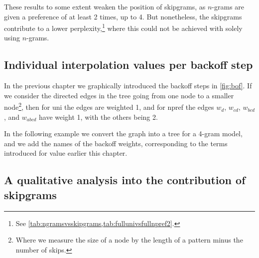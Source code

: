 These results to some extent weaken the position of skipgrams, as $n$-grams are given a preference of at least 2 times, up to 4. But nonetheless, the skipgrams contribute to a lower perplexity,\footnote{See \cref{tab:ngramsvsskipgrams,tab:fullunivsfullnpref2}.} where this could not be achieved with solely using $n$-grams.

\subsection{Individual interpolation values per backoff step}
In the previous chapter we graphically introduced the backoff steps in \cref{fig:bof}. If we consider the directed edges in the tree going from one node to a smaller node\footnote{Where we measure the size of a node by the length of a pattern minus the number of skips.}, then for \textsf{uni} the edges are weighted 1, and for \textsf{npref} the edges $w_{d}$, $w_{cd}$, $w_{bcd}$, and $w_{abcd}$ have weight 1, with the others being 2.

In the following example we convert the graph into a tree for a 4-gram model, and we add the names of the backoff weights, corresponding to the terms introduced for \textsf{value} earlier this chapter.




\subsection{A qualitative analysis into the contribution of skipgrams}

